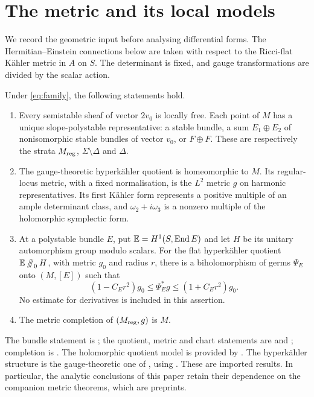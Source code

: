 \section{The metric and its local models}\label{sec:geometry}

We record the geometric input before analysing differential forms.
The Hermitian--Einstein connections below are taken with respect to
the Ricci-flat K\"ahler metric in $A$ on $S$. The determinant is
fixed, and gauge transformations are divided by the scalar action.

\begin{recollection}\label{thm:imported}
Under \eqref{eq:family}, the following statements hold.
\begin{enumerate}
\item Every semistable sheaf of vector $2v_0$ is locally free.
Each point of $M$ has a unique slope-polystable representative:
a stable bundle, a sum $E_1\oplus E_2$ of nonisomorphic stable
bundles of vector $v_0$, or $F\oplus F$. These are respectively
the strata $M_{\mathrm{reg}}$, $\Sigma\setminus\Delta$ and $\Delta$.
\item The gauge-theoretic hyperk\"ahler quotient is homeomorphic
to $M$. Its regular-locus metric, with a fixed normalisation, is
the $L^2$ metric $g$ on harmonic representatives. Its first
K\"ahler form represents a positive multiple of an ample
determinant class, and $\omega_2+i\omega_3$ is a nonzero multiple
of the holomorphic symplectic form.
\item At a polystable bundle $E$, put
$\mathbb E=H^1(S,\operatorname{End} E)$ and let $H$ be its unitary automorphism
group modulo scalars. For the flat hyperk\"ahler quotient
$\mathbb E\mathbin{/\!\!/\!\!/}_0H$, with metric $g_0$ and radius $r$, there is a
biholomorphism of germs $\Psi_E$ onto $(M,[E])$ such that
\begin{equation}\label{eq:imported-metric}
 (1-C_Er^2)g_0\le\Psi_E^*g\le(1+C_Er^2)g_0.
\end{equation}
No estimate for derivatives is included in this assertion.
\item The metric completion of $(M_{\mathrm{reg}},g)$ is $M$.
\end{enumerate}
\end{recollection}

The bundle statement is \cite[Proposition~2.1]{wue20}; the
quotient, metric and chart statements are
\cite[Theorem~1.1]{wue15} and
\cite[Theorem~1.1, Lemma~5.2 and \S5.3]{wue20}; completion is
\cite[Proposition~4.2]{wue20}. The holomorphic quotient model is
provided by \cite{as18,bz19}. The hyperk\"ahler structure is the
gauge-theoretic one of \cite{hklr87,itoh88}, using
\cite{donaldson85,uy86}. These are imported results. In particular,
the analytic conclusions of this paper retain their dependence on
the companion metric theorems, which are preprints.

